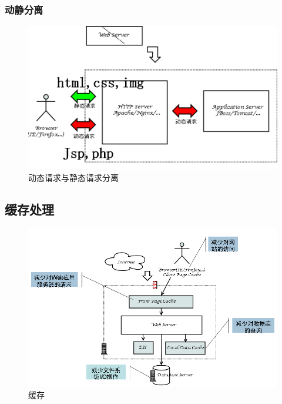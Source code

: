 \documentclass[UTF8,a4paper,8pt]{ctexbook}
\begin{document}
			\subsubsection{动静分离}	
				\begin{figure}[ht]
					\centering
					\includegraphics[width=0.7\linewidth]{web-Server}
					\caption{动态请求与静态请求分离}
					\label{fig:web-server}
				\end{figure}
		\subsection{缓存处理}
			\begin{figure}[ht]
				\centering
				\includegraphics[width=0.7\linewidth]{server-cache}
				\caption{缓存}
				\label{fig:server-cache}
			\end{figure}
		
\end{document}
